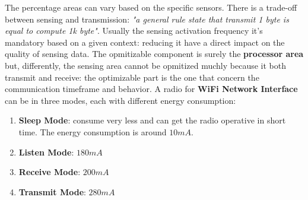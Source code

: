 \documentclass[10pt,a4paper]{report}
\theoremstyle{definition}
\begin{document}
The percentage areas can vary based on the specific sensors. There is a trade-off between sensing and transmission: \textit{"a general rule state that transmit 1 byte is equal to compute 1k byte"}.
Usually the sensing activation frequency it's mandatory based on a given context: reducing it have a direct impact on the quality of sensing data. The opmitizable component is surely the \textbf{processor area} but, differently, the sensing area cannot be opmitized muchly because it both transmit and receive: the optimizable part is the one that concern the communication timeframe and behavior.
A radio for \textbf{WiFi Network Interface} can be in three modes, each with different energy consumption:
\begin{enumerate}
	\item 
	\textbf{Sleep Mode}: consume very less and can get the radio operative in short time. The energy consumption is around $10mA$.
	\item 
	\textbf{Listen Mode}: $180mA$
	\item 
	\textbf{Receive Mode}: $200mA$
	\item 
	\textbf{Transmit Mode}: $280 mA$
\end{enumerate}
\end{document}
